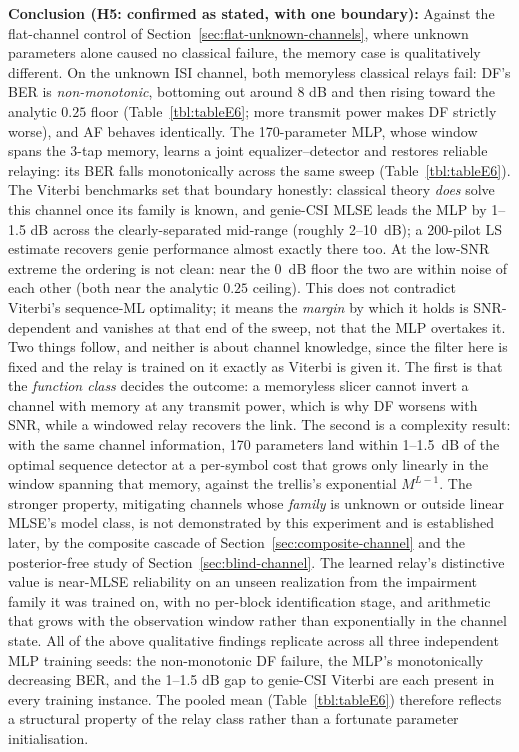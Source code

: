 \textbf{Conclusion (H5: confirmed as stated, with one boundary):} Against the flat-channel control of Section~\ref{sec:flat-unknown-channels}, where unknown parameters alone caused no classical failure, the memory case is qualitatively different. On the unknown ISI channel, both memoryless classical relays fail: DF's BER is \emph{non-monotonic}, bottoming out around 8 dB and then rising toward the analytic $0.25$ floor (Table~\ref{tbl:tableE6}; more transmit power makes DF strictly worse), and AF behaves identically. The 170-parameter MLP, whose window spans the 3-tap memory, learns a joint equalizer--detector and restores reliable relaying: its BER falls monotonically across the same sweep (Table~\ref{tbl:tableE6}). The Viterbi benchmarks set that boundary honestly: classical theory \emph{does} solve this channel once its family is known, and genie-CSI MLSE leads the MLP by 1--1.5 dB across the clearly-separated mid-range (roughly 2--10~dB); a 200-pilot LS estimate recovers genie performance almost exactly there too. At the low-SNR extreme the ordering is not clean: near the 0~dB floor the two are within noise of each other (both near the analytic $0.25$ ceiling). This does not contradict Viterbi's sequence-ML optimality; it means the \emph{margin} by which it holds is SNR-dependent and vanishes at that end of the sweep, not that the MLP overtakes it. Two things follow, and neither is about channel knowledge, since the filter here is fixed and the relay is trained on it exactly as Viterbi is given it. The first is that the \emph{function class} decides the outcome: a memoryless slicer cannot invert a channel with memory at any transmit power, which is why DF worsens with SNR, while a windowed relay recovers the link. The second is a complexity result: with the same channel information, 170 parameters land within 1--1.5~dB of the optimal sequence detector at a per-symbol cost that grows only linearly in the window spanning that memory, against the trellis's exponential $M^{L-1}$. The stronger property, mitigating channels whose \emph{family} is unknown or outside linear MLSE's model class, is not demonstrated by this experiment and is established later, by the composite cascade of Section~\ref{sec:composite-channel} and the posterior-free study of Section~\ref{sec:blind-channel}. The learned relay's distinctive value is near-MLSE reliability on an unseen realization from the impairment family it was trained on, with no per-block identification stage, and arithmetic that grows with the observation window rather than exponentially in the channel state. All of the above qualitative findings replicate across all three independent MLP training seeds: the non-monotonic DF failure, the MLP's monotonically decreasing BER, and the 1--1.5 dB gap to genie-CSI Viterbi are each present in every training instance. The pooled mean (Table~\ref{tbl:tableE6}) therefore reflects a structural property of the relay class rather than a fortunate parameter initialisation.

